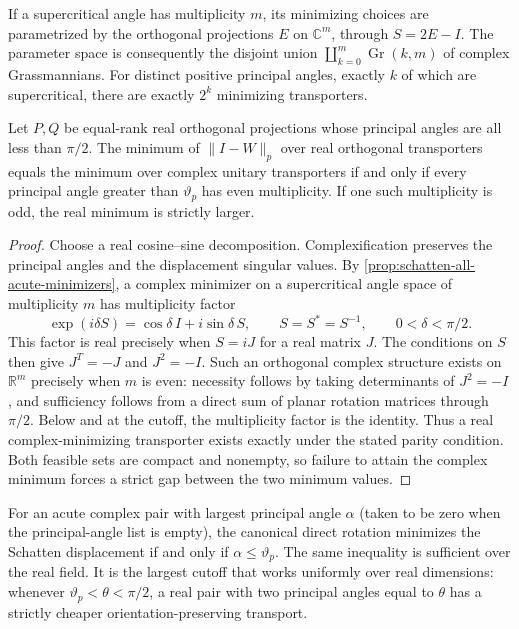 If a supercritical angle has multiplicity $m$, its minimizing choices are
parametrized by the orthogonal projections $E$ on $\mathbb C^m$, through
$S=2E-I$. The parameter space is consequently the disjoint union
$\coprod_{k=0}^{m}\operatorname{Gr}(k,m)$ of complex Grassmannians.
For distinct positive principal angles, exactly $k$ of which are
supercritical, there are exactly $2^k$ minimizing transporters.

\begin{corollary}
\label{cor:schatten-real-parity}
Let $P,Q$ be equal-rank real orthogonal projections whose principal
angles are all less than $\pi/2$. The minimum of $\|I-W\|_p$ over real
orthogonal transporters equals the minimum over complex unitary
transporters if and only if every principal angle greater than
$\vartheta_p$ has even multiplicity. If one such multiplicity is odd,
the real minimum is strictly larger.
\end{corollary}

\begin{proof}
Choose a real cosine--sine decomposition. Complexification preserves the
principal angles and the displacement singular values. By
\cref{prop:schatten-all-acute-minimizers}, a complex minimizer on a
supercritical angle space of multiplicity $m$ has multiplicity factor
\[
 \exp(i\delta S)=\cos\delta\,I+i\sin\delta\,S,
 \qquad S=S^*=S^{-1},\qquad 0<\delta<\pi/2.
\]
This factor is real precisely when $S=iJ$ for a real matrix $J$.
The conditions on $S$ then give $J^T=-J$ and $J^2=-I$.
Such an orthogonal complex structure exists on $\mathbb R^m$ precisely
when $m$ is even: necessity follows by taking determinants of $J^2=-I$,
and sufficiency follows from a direct sum of planar rotation matrices through $\pi/2$.
Below and at the cutoff, the multiplicity factor is the identity.
Thus a real complex-minimizing transporter exists exactly under the
stated parity condition. Both feasible sets are compact and nonempty,
so failure to attain the complex minimum forces a strict gap between
the two minimum values.
\end{proof}

\begin{corollary}
\label{cor:schatten-canonical-cutoff}
For an acute complex pair with largest principal angle $\alpha$ (taken
to be zero when the principal-angle list is empty), the
canonical direct rotation minimizes the Schatten displacement if and
only if $\alpha\leq\vartheta_p$. The same inequality is sufficient over
the real field. It is the largest cutoff that works uniformly over
real dimensions: whenever $\vartheta_p<\theta<\pi/2$, a real pair with
two principal angles equal to $\theta$ has a strictly cheaper
orientation-preserving transport.
\end{corollary}

